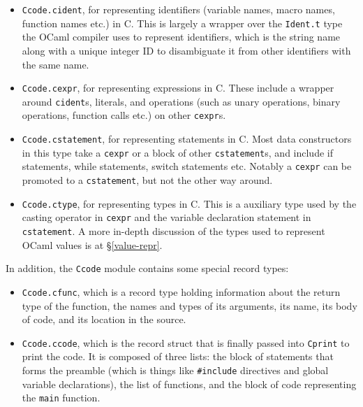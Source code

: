 \documentclass[12pt,a4paper,twoside,openright]{report}
\begin{document}
\begin{itemize}

\item \texttt{Ccode.cident}, for representing identifiers (variable names, macro
    names, function names etc.) in C. This is largely a wrapper over the
    \texttt{Ident.t} type the OCaml compiler uses to represent identifiers,
    which is the string name along with a unique integer ID to disambiguate it
    from other identifiers with the same name.

\item \texttt{Ccode.cexpr}, for representing expressions in C. These include a
    wrapper around \texttt{cident}s, literals, and operations (such as unary
    operations, binary operations, function calls etc.) on other
    \texttt{cexpr}s.

\item \texttt{Ccode.cstatement}, for representing statements in C. Most data
    constructors in this type take a \texttt{cexpr} or a block of other
    \texttt{cstatement}s, and include if statements, while statements, switch
    statements etc. Notably a \texttt{cexpr} can be promoted to a
    \texttt{cstatement}, but not the other way around.

\item \texttt{Ccode.ctype}, for representing types in C. This is a auxiliary
    type used by the casting operator in \texttt{cexpr} and the variable
    declaration statement in \texttt{cstatement}. A more in-depth discussion of
    the types used to represent OCaml values is at \S\ref{value-repr}.

\end{itemize}

In addition, the \texttt{Ccode} module contains some special record types:

\begin{itemize}

\item \texttt{Ccode.cfunc}, which is a record type holding information about the
    return type of the function, the names and types of its arguments, its name,
    its body of code, and its location in the source.

\item \texttt{Ccode.ccode}, which is the record struct that is finally passed
    into \texttt{Cprint} to print the code. It is composed of three lists: the
    block of statements that forms the preamble (which is things like
    \texttt{\#}\texttt{include} directives and global variable declarations),
    the list of functions, and the block of code representing the \texttt{main}
    function.

\end{itemize}
\end{document}

